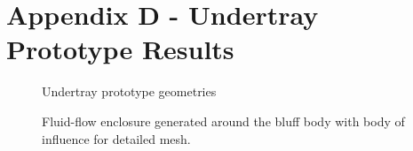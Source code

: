 \newpage
\flushleft
\section*{Appendix D - Undertray Prototype Results} 

\begin{figure}[!htb]
    \centering
    \noindent{}
    \caption{Undertray prototype geometries}
    \label{fig:UTP_D}
\end{figure}

\begin{figure}[!htb]
    \centering
    \noindent{}
    \caption{Fluid-flow enclosure generated around the bluff body with body of influence for detailed mesh.}
    \label{fig:UTP_Fluid_flow}
\end{figure}

